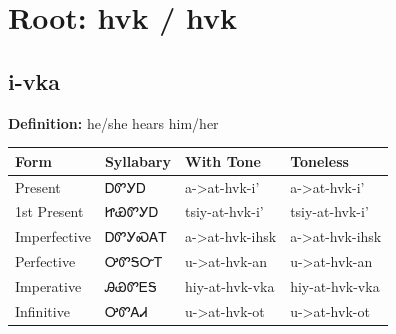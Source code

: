 \documentclass{article}%
\begin{document}
%
\normalsize%
\section*{Root: hvk / hvk}%
\subsection*{i-vka}%
\textbf{Definition: }%
he/she hears him/her%
\\[0.5em]%
\begin{tabular}{|l|l|l|l|}%
\hline%
\textbf{Form}&\textbf{Syllabary}&\textbf{With Tone}&\textbf{Toneless}\\%
\hline%
Present&ᎠᏛᎩᎠ&a{-}>at{-}hvk{-}i'&a{-}>at{-}hvk{-}i'\\%
1st Present&ᏥᏯᏛᎩᎠ&tsiy{-}at{-}hvk{-}i'&tsiy{-}at{-}hvk{-}i'\\%
Imperfective&ᎠᏛᎩᏍᎪᎢ&a{-}>at{-}hvk{-}ihsk&a{-}>at{-}hvk{-}ihsk\\%
Perfective&ᎤᏛᎦᏅᎢ&u{-}>at{-}hvk{-}an&u{-}>at{-}hvk{-}an\\%
Imperative&ᎯᏯᏛᎬᎦ&hiy{-}at{-}hvk{-}vka&hiy{-}at{-}hvk{-}vka\\%
Infinitive&ᎤᏛᎪᏗ&u{-}>at{-}hvk{-}ot&u{-}>at{-}hvk{-}ot\\%
\hline%
\end{tabular}%
\\[1em]%
\end{document}
